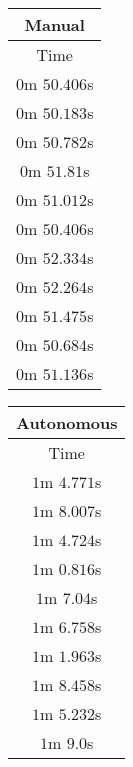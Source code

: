 \begin{appendices}
\begin{table}[!h]
	\centering
	\begin{tabular}{ c }
		\toprule
		\textbf{Manual} \\
		\midrule
		Time \\
		\midrule
		$0$m $50.406$s \\

		$0$m $50.183$s \\

		$0$m $50.782$s \\

		$0$m $51.81$s \\

		$0$m $51.012$s \\

		$0$m $50.406$s \\

		$0$m $52.334$s \\

		$0$m $52.264$s \\

		$0$m $51.475$s \\

		$0$m $50.684$s \\

		\midrule
		$0$m $51.136$s \\
		\bottomrule
	\end{tabular}
	\hspace{2ex}
	\begin{tabular}{ c }
		\toprule
		\textbf{Autonomous} \\
		\midrule
		Time \\
		\midrule
		$1$m $4.771$s \\

		$1$m $8.007$s \\

		$1$m $4.724$s \\

		$1$m $0.816$s \\

		$1$m $7.04$s \\

		$1$m $6.758$s \\

		$1$m $1.963$s \\

		$1$m $8.458$s \\

		$1$m $5.232$s \\

		$1$m $9.0$s \\


\end{tabular}
\end{table}
\end{appendices}
